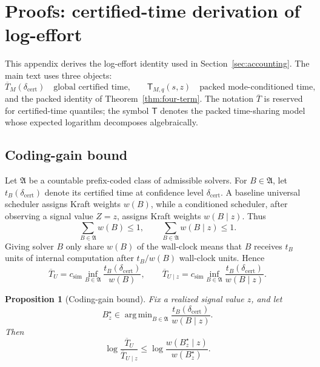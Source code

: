 \documentclass{article}
\newtheorem{proposition}{Proposition}
\DeclareMathOperator*{\argmin}{arg\,min}
\begin{document}
\clearpage



\clearpage

\appendix



\clearpage
\section{Proofs: certified-time derivation of log-effort}
\label{app:proofs}
\label{app:certified-log-effort}
\label{app:proofs}

This appendix derives the log-effort identity used in Section~\ref{sec:accounting}.
The main text uses three objects:
\[
    \overline T_M(\delta_{\mathrm{cert}})
    \quad\text{global certified time,}
    \qquad
    \mathsf T_{M,q}(s,z)
    \quad\text{packed mode-conditioned time,}
\]
and the packed identity of Theorem~\ref{thm:four-term}.
The notation \(\overline T\) is reserved for certified-time quantiles; the symbol
\(\mathsf T\) denotes the packed time-sharing model whose expected logarithm decomposes
algebraically.

\subsection{Coding-gain bound}

Let \(\mathfrak A\) be a countable prefix-coded class of admissible solvers.  For
\(B\in\mathfrak A\), let \(t_B(\delta_{\mathrm{cert}})\) denote its certified time at
confidence level \(\delta_{\mathrm{cert}}\).  A baseline universal scheduler assigns Kraft
weights \(w(B)\), while a conditioned scheduler, after observing a signal value \(Z=z\),
assigns Kraft weights \(w(B\mid z)\).  Thus
\[
    \sum_{B\in\mathfrak A}w(B)\le 1,
    \qquad
    \sum_{B\in\mathfrak A}w(B\mid z)\le 1.
\]
Giving solver \(B\) only share \(w(B)\) of the wall-clock means that \(B\) receives
\(t_B\) units of internal computation after \(t_B/w(B)\) wall-clock units.  Hence
\[
    \overline T_U
    =
    c_{\mathrm{sim}}
    \inf_{B\in\mathfrak A}
    \frac{t_B(\delta_{\mathrm{cert}})}{w(B)},
    \qquad
    \overline T_{U\mid z}
    =
    c_{\mathrm{sim}}
    \inf_{B\in\mathfrak A}
    \frac{t_B(\delta_{\mathrm{cert}})}{w(B\mid z)}.
\]

\begin{proposition}[Coding-gain bound]
\label{prop:app-coding-gain}
Fix a realized signal value \(z\), and let
\[
    B_z^\star
    \in
    \argmin_{B\in\mathfrak A}
    \frac{t_B(\delta_{\mathrm{cert}})}{w(B\mid z)}.
\]
Then
\[
    \log\frac{\overline T_U}{\overline T_{U\mid z}}
    \le
    \log\frac{w(B_z^\star\mid z)}{w(B_z^\star)}.
\]
\end{proposition}
\end{document}
